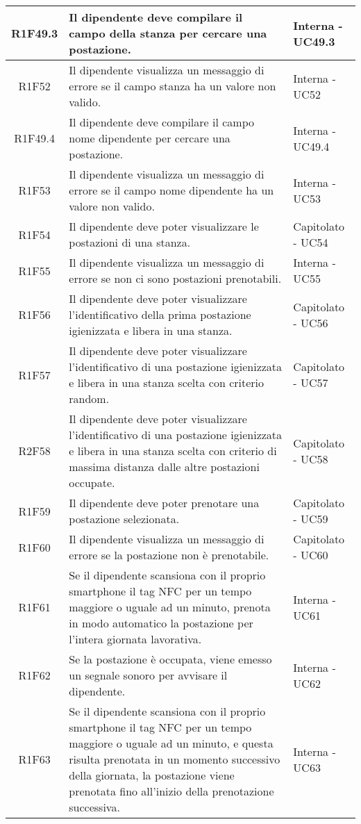 \begin{center}
\begin{longtable}{|c|p{10cm}|p{4cm}|}
		\hline
		R1F49.3&Il dipendente deve compilare il campo della stanza per cercare una postazione.		&Interna - UC49.3	\\
		\hline
		R1F52&Il dipendente visualizza un messaggio di errore se il campo stanza ha un valore non valido.	&Interna - UC52	\\
		\hline
		R1F49.4&Il dipendente deve compilare il campo nome dipendente per cercare una postazione.	&Interna - UC49.4	\\
		\hline
		R1F53&Il dipendente visualizza un messaggio di errore se il campo nome dipendente ha un valore non valido.	&Interna - UC53	\\
		\hline
		R1F54&Il dipendente deve poter visualizzare le postazioni di una stanza.	&Capitolato - UC54	\\
		\hline
		R1F55&Il dipendente visualizza un messaggio di errore se non ci sono postazioni prenotabili.	&Interna - UC55	\\
		\hline
		R1F56&Il dipendente deve poter visualizzare l'identificativo della prima postazione igienizzata e libera in una stanza.	&Capitolato - UC56	\\
		\hline
		R1F57&Il dipendente deve poter visualizzare l'identificativo di una postazione igienizzata e libera in una stanza scelta con criterio random.	&Capitolato - UC57	\\
		\hline
		R2F58&Il dipendente deve poter visualizzare l'identificativo di una postazione igienizzata e libera in una stanza scelta con criterio di massima distanza dalle altre postazioni occupate.	&Capitolato - UC58	\\
		\hline
		R1F59&Il dipendente deve poter prenotare una postazione selezionata.	&Capitolato - UC59	\\
		\hline
		R1F60&Il dipendente visualizza un messaggio di errore se la postazione non è prenotabile.	&Capitolato - UC60	\\
		\hline
		R1F61&Se il dipendente scansiona con il proprio smartphone il tag NFC per un tempo maggiore o uguale ad un minuto, prenota in modo automatico la postazione per l’intera giornata lavorativa. &Interna - UC61	\\
		\hline
		R1F62&Se la postazione è occupata, viene emesso un segnale sonoro per avvisare il dipendente.	& Interna - UC62	\\
		\hline
		R1F63&Se il dipendente scansiona con il proprio smartphone il tag NFC per un tempo maggiore o uguale ad un minuto, e questa risulta prenotata in un momento successivo della giornata, la postazione viene prenotata fino all'inizio della prenotazione successiva.	&Interna - UC63	\\

\end{longtable}
\end{center}
